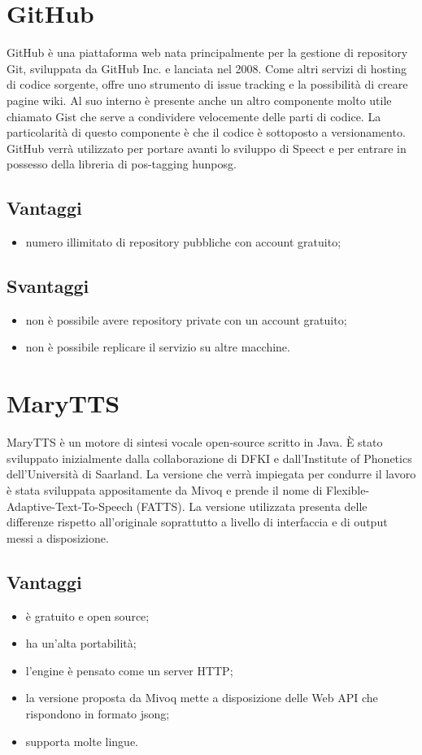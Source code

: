 \section{GitHub}
GitHub è una piattaforma web nata principalmente per la gestione di repository Git, sviluppata da GitHub Inc. e lanciata nel 2008. Come altri servizi di hosting di codice sorgente, offre uno strumento di issue tracking e la possibilità di creare pagine wiki. Al suo interno è presente anche un altro componente molto utile chiamato Gist che serve a condividere velocemente delle parti di codice. La particolarità di questo componente è che il codice è sottoposto a versionamento.\\
GitHub verrà utilizzato per portare avanti lo sviluppo di Speect e per entrare in possesso della libreria di pos-tagging \gls{hunposg}.
\subsection*{Vantaggi}
\begin{itemize}
	\item numero illimitato di repository pubbliche con account gratuito;
\end{itemize}
\subsection*{Svantaggi}
\begin{itemize}
	\item non è possibile avere repository private con un account gratuito;
	\item non è possibile replicare il servizio su altre macchine.
\end{itemize}
\section{MaryTTS}
MaryTTS è un motore di sintesi vocale open-source scritto in Java. È stato sviluppato inizialmente dalla collaborazione di DFKI e dall'Institute of Phonetics dell'Università di Saarland. La versione che verrà impiegata per condurre il lavoro è stata sviluppata appositamente da Mivoq e prende il nome di Flexible-Adaptive-Text-To-Speech (FATTS). La versione utilizzata presenta delle differenze rispetto all'originale soprattutto a livello di interfaccia e di output messi a disposizione.
\subsection*{Vantaggi}
\begin{itemize}
	\item è gratuito e open source;
	\item ha un'alta portabilità;
	\item l'engine è pensato come un server HTTP;
	\item la versione proposta da Mivoq mette a disposizione delle Web API che rispondono in formato \gls{jsong};
	\item supporta molte lingue.
\end{itemize}
